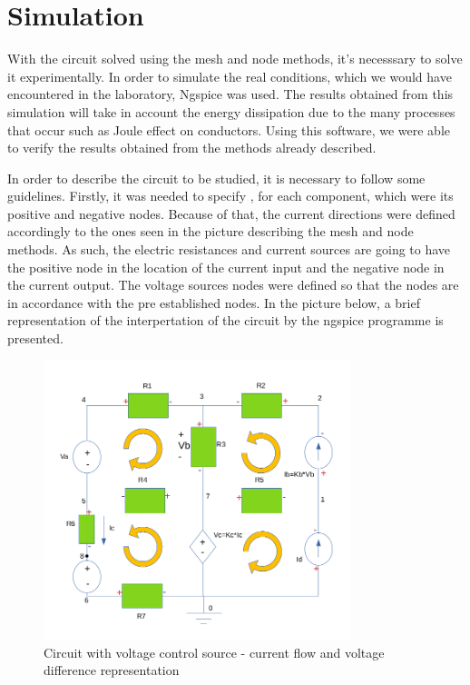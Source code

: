 
\section{Simulation}
\label{sec:simulation}

\par  With the circuit solved using the mesh and node methods, it's necesssary to solve it experimentally. In order to simulate the real conditions, which we would have encountered in the laboratory, Ngspice was used. The results obtained from this simulation will take in account the energy dissipation due to the many processes that occur such as Joule effect on conductors. Using this software, we were able to verify the results obtained from the methods already described. 
\par  In order to describe the circuit to be studied, it is necessary to follow some guidelines. Firstly, it was needed to specify , for each component, which were its positive and negative nodes. Because of that, the current directions were defined accordingly to the ones seen in the picture describing the mesh and node methods. As such, the electric resistances and current sources are going to have the positive node in the location of the current input and the negative node in the current output. The voltage sources nodes were defined so that the nodes are in accordance with the pre established nodes. In the picture below, a brief representation of the interpertation of the circuit by the ngspice programme is presented.

\begin{figure}[ht]
\includegraphics[width=0.8\textwidth]{Esquema_salito.PNG}
\centering
\caption{Circuit with voltage control source - current flow and voltage difference representation}
\label{fig:figure5}
\end{figure}

